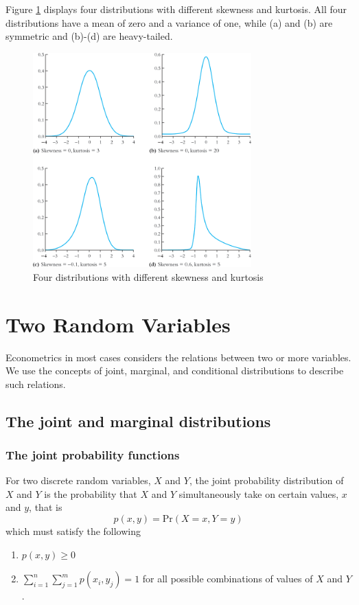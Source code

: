 \documentclass[a4paper,11pt]{article}
\begin{document}
\begin{itemize}
Figure \ref{fig:orgcae6c58} displays four distributions with different
skewness and kurtosis. All four distributions have a mean of zero and
a variance of one, while (a) and (b) are symmetric and (b)-(d) are
heavy-tailed.

\begin{figure}[htbp]
\centering
\includegraphics[width=0.75\textwidth,height=0.5\textheight]{figure/fig-2-3.png}
\caption{\label{fig:orgcae6c58}
Four distributions with different skewness and kurtosis}
\end{figure}
\end{itemize}


\section{Two Random Variables}
\label{sec:org7d441c7}

Econometrics in most cases considers the relations between two or
more variables. We use the concepts of joint, marginal, and
conditional distributions to describe such relations.

\subsection{The joint and marginal distributions}
\label{sec:org8bbcdf9}

\subsubsection*{The joint probability functions}
\label{sec:org5e97d59}

For two discrete random variables, \(X\) and \(Y\), the joint probability
distribution of \(X\) and \(Y\) is the probability that \(X\) and \(Y\)
simultaneously take on certain values, \(x\) and \(y\), that is
\[ p(x, y) = \mathrm{Pr}(X = x, Y = y)\]
which must satisfy the following
\begin{enumerate}
\item \(p(x, y) \geq 0\)
\item \(\sum_{i=1}^n\sum_{j=1}^m p(x_i, y_j) = 1\) for all possible
combinations of values of \(X\) and \(Y\).
\end{enumerate}
\end{document}
